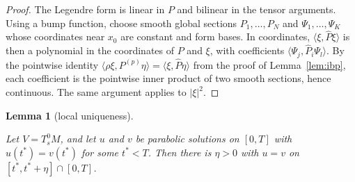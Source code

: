\documentclass[11pt,reqno]{amsart}
\newtheorem{lemma}[theorem]{Lemma}
\theoremstyle{definition}
\theoremstyle{remark}
\newcommand{\ip}[2]{\langle #1,#2\rangle}
\newcommand{\abs}[1]{\lvert #1\rvert}
\newcommand{\hatP}{\widehat{P}}
\newcommand{\lean}[1]{}
\newcommand{\uses}[1]{}
\numberwithin{equation}{section}
\begin{document}
\begin{proof}
The Legendre form is linear in $P$ and bilinear in the tensor arguments. Using a bump function,
choose smooth global sections $P_1,\dots,P_N$ and $\Psi_1,\dots,\Psi_K$ whose coordinates near $x_0$
are constant and form bases. In coordinates, $\ip{\xi}{\hatP\xi}$ is then a polynomial in the
coordinates of $P$ and $\xi$, with coefficients $\ip{\Psi_j}{\hatP_i\Psi_l}$. By the pointwise identity
$\ip{\rho\xi}{P^{(p)}\eta}=\ip{\xi}{\hatP\eta}$ from the proof of Lemma~\ref{lem:ibp}, each coefficient
is the pointwise inner product of two smooth sections, hence continuous. The same argument applies to
$\abs\xi^2$.
\end{proof}

\begin{lemma}[local uniqueness]\label{lem:local-unique}
\lean{ShortTime.EquationData.local_unique, ShortTime.EquationData.exists_parabolic_segment, ShortTime.EquationData.tube_local, ShortTime.LegendreAt.mono}
\uses{def:solution, def:legendre, def:class, lem:difference}
Let $V=T^0_sM$, and let $u$ and $v$ be parabolic solutions on $[0,T]$ with $u(t^*)=v(t^*)$ for some
$t^*<T$. Then there is $\eta>0$ with $u=v$ on $[t^*,t^*+\eta]\cap[0,T]$.
\end{lemma}
\end{document}
